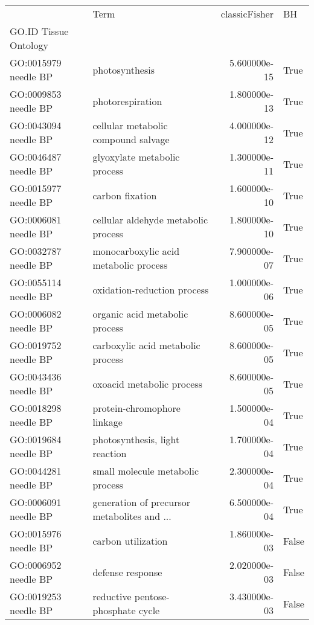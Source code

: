 \begin{tabular}{llrl}
\toprule
{} &                                         Term &  classicFisher &     BH \\
GO.ID      Tissue Ontology &                                              &                &        \\
GO:0015979 needle BP       &  photosynthesis &  5.600000e-15 &  True \\
\midrule
GO:0009853 needle BP       &  photorespiration &  1.800000e-13 &  True \\
GO:0043094 needle BP       &  cellular metabolic compound salvage &  4.000000e-12 &  True \\
GO:0046487 needle BP       &  glyoxylate metabolic process &  1.300000e-11 &  True \\
GO:0015977 needle BP       &  carbon fixation &  1.600000e-10 &  True \\
GO:0006081 needle BP       &  cellular aldehyde metabolic process &  1.800000e-10 &  True \\
GO:0032787 needle BP       &  monocarboxylic acid metabolic process &  7.900000e-07 &  True \\
GO:0055114 needle BP       &  oxidation-reduction process &  1.000000e-06 &  True \\
GO:0006082 needle BP       &  organic acid metabolic process &  8.600000e-05 &  True \\
GO:0019752 needle BP       &  carboxylic acid metabolic process &  8.600000e-05 &  True \\
GO:0043436 needle BP       &  oxoacid metabolic process &  8.600000e-05 &  True \\
GO:0018298 needle BP       &  protein-chromophore linkage &  1.500000e-04 &  True \\
GO:0019684 needle BP       &  photosynthesis, light reaction &  1.700000e-04 &  True \\
GO:0044281 needle BP       &  small molecule metabolic process &  2.300000e-04 &  True \\
GO:0006091 needle BP       &  generation of precursor metabolites and ... &  6.500000e-04 &  True \\
GO:0015976 needle BP       &  carbon utilization &  1.860000e-03 &  False \\
GO:0006952 needle BP       &  defense response &  2.020000e-03 &  False \\
GO:0019253 needle BP       &  reductive pentose-phosphate cycle &  3.430000e-03 &  False \\

\end{tabular}
